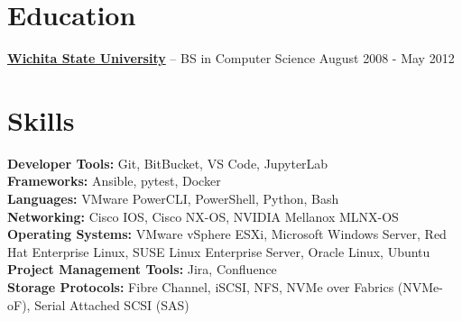 \documentclass[11pt]{article}       %
\begin{document}

\vspace{-18.5pt}

\section*{Education}
\textbf{\href{https://www.wichita.edu}{Wichita State University}} -- BS in Computer Science \hfill August 2008 - May 2012




\section*{Skills}
\textbf{Developer Tools:} Git, BitBucket, VS Code, JupyterLab \\
\textbf{Frameworks:} Ansible, pytest, Docker \\
\textbf{Languages:} VMware PowerCLI, PowerShell, Python, Bash \\
\textbf{Networking:} Cisco IOS, Cisco NX-OS, NVIDIA Mellanox MLNX-OS \\
\textbf{Operating Systems:} VMware vSphere ESXi, Microsoft Windows Server, Red Hat Enterprise Linux, SUSE Linux Enterprise Server, Oracle Linux, Ubuntu \\
\textbf{Project Management Tools:} Jira, Confluence \\
\textbf{Storage Protocols:} Fibre Channel, iSCSI, NFS, NVMe over Fabrics (NVMe-oF), Serial Attached SCSI (SAS)

\vspace{-6.5pt}
\end{document}
